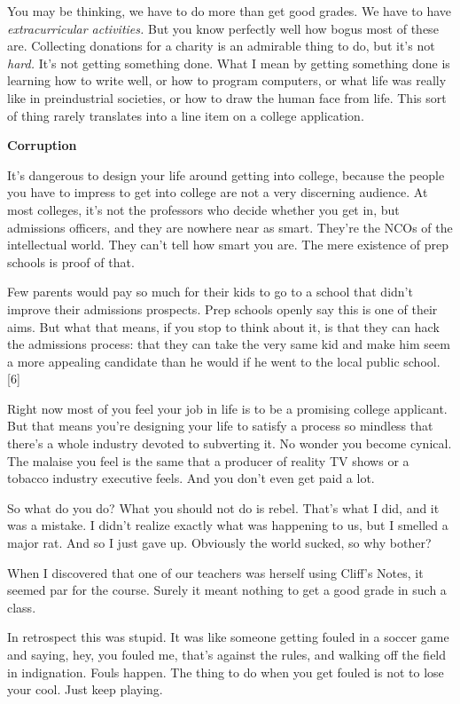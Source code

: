 You may be thinking, we have to do more than get good grades. We have to
have \emph{extracurricular activities.} But you know perfectly well how
bogus most of these are. Collecting donations for a charity is an
admirable thing to do, but it's not \emph{hard.} It's not getting
something done. What I mean by getting something done is learning how to
write well, or how to program computers, or what life was really like in
preindustrial societies, or how to draw the human face from life. This
sort of thing rarely translates into a line item on a college
application.

\textbf{Corruption}

It's dangerous to design your life around getting into college, because
the people you have to impress to get into college are not a very
discerning audience. At most colleges, it's not the professors who
decide whether you get in, but admissions officers, and they are nowhere
near as smart. They're the NCOs of the intellectual world. They can't
tell how smart you are. The mere existence of prep schools is proof of
that.

Few parents would pay so much for their kids to go to a school that
didn't improve their admissions prospects. Prep schools openly say this
is one of their aims. But what that means, if you stop to think about
it, is that they can hack the admissions process: that they can take the
very same kid and make him seem a more appealing candidate than he would
if he went to the local public school. {[}6{]}

Right now most of you feel your job in life is to be a promising college
applicant. But that means you're designing your life to satisfy a
process so mindless that there's a whole industry devoted to subverting
it. No wonder you become cynical. The malaise you feel is the same that
a producer of reality TV shows or a tobacco industry executive feels.
And you don't even get paid a lot.

So what do you do? What you should not do is rebel. That's what I did,
and it was a mistake. I didn't realize exactly what was happening to us,
but I smelled a major rat. And so I just gave up. Obviously the world
sucked, so why bother?

When I discovered that one of our teachers was herself using Cliff's
Notes, it seemed par for the course. Surely it meant nothing to get a
good grade in such a class.

In retrospect this was stupid. It was like someone getting fouled in a
soccer game and saying, hey, you fouled me, that's against the rules,
and walking off the field in indignation. Fouls happen. The thing to do
when you get fouled is not to lose your cool. Just keep playing.

